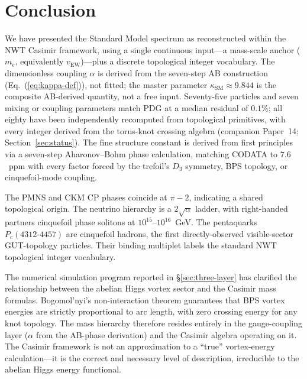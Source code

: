 \documentclass[11pt]{article}
\newcommand{\ksm}{\kappa_\text{SM}}
\begin{document}
\section{Conclusion}
\label{sec:conclusion}

We have presented the Standard Model spectrum as reconstructed
within the NWT Casimir framework, using a single continuous
input---a mass-scale anchor ($m_e$, equivalently
$v_\text{EW}$)---plus a discrete topological integer vocabulary.
The dimensionless coupling $\alpha$ is derived from the seven-step
AB construction (Eq.~(\ref{eq:kappa-def})), not fitted; the master
parameter $\ksm \approx 9.844$ is the composite AB-derived
quantity, not a free input.  Seventy-five particles and seven
mixing or coupling parameters match PDG at a median residual of
$0.1\%$; all eighty have been independently recomputed from
topological primitives, with every integer derived from the
torus-knot crossing algebra (companion Paper~14;
Section~\ref{sec:status}).  The fine
structure constant is derived from first principles via a
seven-step Aharonov--Bohm phase calculation, matching CODATA to
$7.6$~ppm with every factor forced by the trefoil's $D_3$
symmetry, BPS topology, or cinquefoil-mode coupling.

The PMNS and CKM CP phases coincide at $\pi - 2$, indicating a
shared topological origin.  The neutrino hierarchy is a
$2\sqrt{\alpha}$ ladder, with right-handed partners cinquefoil
phase solitons at $10^{15}$--$10^{16}$~GeV.  The pentaquarks
$P_c(4312\text{-}4457)$ are cinquefoil hadrons, the first
directly-observed visible-sector GUT-topology particles.  Their
binding multiplet labels the standard NWT topological integer
vocabulary.

The numerical simulation program reported in
\S\ref{sec:three-layer} has clarified the relationship between
the abelian Higgs vortex sector and the Casimir mass formulas.
Bogomol'nyi's non-interaction theorem guarantees that BPS vortex
energies are strictly proportional to arc length, with zero
crossing energy for any knot topology.  The mass hierarchy
therefore resides entirely in the gauge-coupling layer ($\alpha$
from the AB-phase derivation) and the Casimir algebra operating
on it.  The Casimir framework is not an approximation to a
``true'' vortex-energy calculation---it is the correct and
necessary level of description, irreducible to the abelian
Higgs energy functional.
\end{document}
